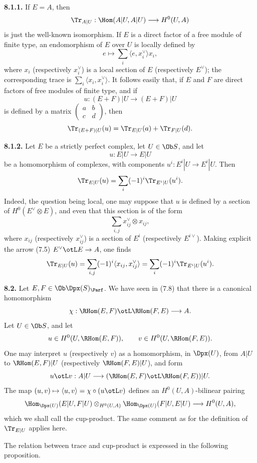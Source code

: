 \textbf{8.1.1.} If \(E=A\), then
\[
  \Tr_{A|U}:\Hom(A|U,A|U)\longrightarrow H^0(U,A)
\]
is just the well-known isomorphism. If \(E\) is a direct factor of a free module of finite type, an endomorphism of \(E\) over \(U\) is locally defined by
\[
  e\longmapsto \sum_i\langle e,x_i^\vee\rangle x_i,
\]
where \(x_i\) (respectively \(x_i^\vee\)) is a local section of \(E\) (respectively \(E^\vee\)); the corresponding trace is \(\sum_i\langle x_i,x_i^\vee\rangle\). It follows easily that, if \(E\) and \(F\) are direct factors of free modules of finite type, and if
\[
  u:(E+F)|U\longrightarrow(E+F)|U
\]
is defined by a matrix \(\begin{pmatrix}a&b\\ c&d\end{pmatrix}\), then
\[
  \Tr_{(E+F)|U}(u)=\Tr_{E|U}(a)+\Tr_{F|U}(d).
\]

\textbf{8.1.2.} Let \(E\) be a strictly perfect complex, let \(U\in\Ob S\), and let
\[
  u:E|U\longrightarrow E|U
\]
be a homomorphism of complexes, with components \(u^i:E^i|U\to E^i|U\). Then
\[
  \Tr_{E|U}(u)=\sum_i(-1)^i\Tr_{E^i|U}(u^i).
\]
Indeed, the question being local, one may suppose that \(u\) is defined by a section of \(H^0(E^\vee\otimes E)\), and even that this section is of the form
\[
  \sum_{i,j}x_{ij}^\vee\otimes x_{ij},
\]
where \(x_{ij}\) (respectively \(x_{ij}^\vee\)) is a section of \(E^i\) (respectively \(E^{i\vee}\)). Making explicit the arrow (7.5) \(E^\vee\otL E\to A\), one finds
\[
  \Tr_{E|U}(u)=\sum_{i,j}(-1)^i\langle x_{ij},x_{ij}^\vee\rangle
  =\sum_i(-1)^i\Tr_{E^i|U}(u^i).
\]

\textbf{8.2.} Let \(E,F\in\Ob\Dpx(S)_{\Parf}\). We have seen in (7.8) that there is a canonical homomorphism
\[
  \chi:\RHom(E,F)\otL\RHom(F,E)\longrightarrow A.
\]
Let \(U\in\Ob S\), and let
\[
  u\in H^0(U,\RHom(E,F)),\qquad v\in H^0(U,\RHom(F,E)).
\]
One may interpret \(u\) (respectively \(v\)) as a homomorphism, in \(\Dpx(U)\), from \(A|U\) to \(\RHom(E,F)|U\) (respectively \(\RHom(F,E)|U\)), and form
\[
  u\otL v:A|U\longrightarrow(\RHom(E,F)\otL\RHom(F,E))|U.
\]
The map \((u,v)\mapsto\langle u,v\rangle=\chi\circ(u\otL v)\) defines an \(H^0(U,A)\)-bilinear pairing
\[
  \Hom_{\Dpx(U)}(E|U,F|U)\otimes_{H^0(U,A)}\Hom_{\Dpx(U)}(F|U,E|U)
  \longrightarrow H^0(U,A),
\]
which we shall call the cup-product. The same comment as for the definition of \(\Tr_{E|U}\) applies here.

The relation between trace and cup-product is expressed in the following proposition.


